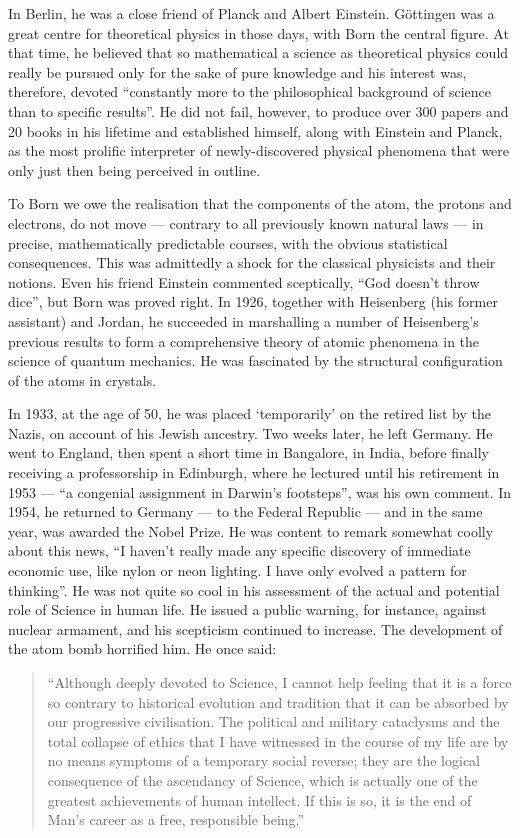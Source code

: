 In Berlin, he was a close friend of Planck and Albert Einstein. G\"ottingen was a great centre for theoretical physics in those days, with Born the central figure. At that time, he believed that so mathematical a science as theoretical physics could really be pursued only for the sake of pure knowledge and his interest was, therefore, devoted ``constantly more to the philosophical background of science than to specific results''. He did not fail, however, to produce over 300 papers and 20 books in his lifetime and established himself, along with Einstein and Planck, as the most prolific interpreter of newly-discovered physical phenomena that were only just then being perceived in outline.

To Born we owe the realisation that the components of the atom, the protons and electrons, do not move --- contrary to all previously known natural laws --- in precise, mathematically predictable courses, with the obvious statistical consequences. This was admittedly a shock for the classical physicists and their notions. Even his friend Einstein commented sceptically, ``God doesn't throw dice'', but Born was proved right. In 1926, together with Heisenberg (his former assistant) and Jordan, he succeeded in marshalling a number of Heisenberg's previous results to form a comprehensive theory of atomic phenomena in the science of quantum mechanics. He was fascinated by the structural configuration of the atoms in crystals.

In 1933, at the age of 50, he was placed `temporarily' on the retired list by the Nazis, on account of his Jewish ancestry. Two weeks later, he left Germany. He went to England, then spent a short time in Bangalore, in India, before finally receiving a professorship in Edinburgh, where he lectured until his retirement in 1953 --- ``a congenial assignment in Darwin's footsteps'', was his own comment. In 1954, he returned to Germany --- to the Federal Republic --- and in the same year, was awarded the Nobel Prize. He was content to remark somewhat coolly about this news, ``I haven't really made any specific discovery of immediate economic use, like nylon or neon lighting. I have only evolved a pattern for thinking''. He was not quite so cool in his assessment of the actual and potential role of Science in human life. He issued a public warning, for instance, against nuclear armament, and his scepticism continued to increase. The development of the atom bomb horrified him. He once said:
\begin{quote}
{\fontsize{10pt}{12pt}\selectfont
``Although deeply devoted to Science, I cannot help feeling that it is a force so contrary to historical evolution and tradition that it can be absorbed by our progressive civilisation. The political and military cataclysms and the total collapse of ethics that I have witnessed in the course of my life are by no means symptoms of a temporary social reverse; they are the logical consequence of the ascendancy of Science, which is actually one of the greatest achievements of human intellect. If this is so, it is the end of Man's career as a free, responsible being.''}\relax
\end{quote}

